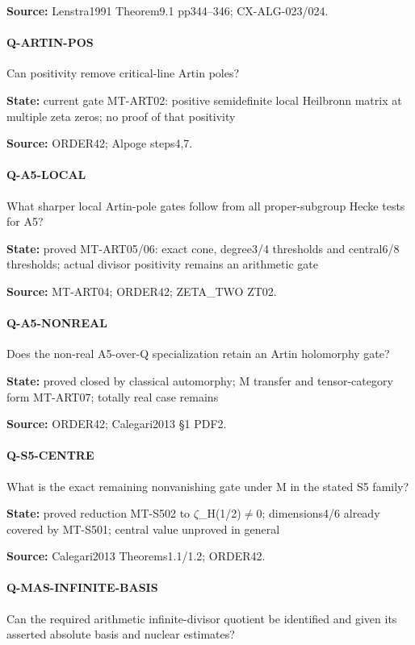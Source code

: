 \documentclass[11pt,a4paper]{article}
\begin{document}
\textbf{Source:} Lenstra1991 Theorem9.\allowbreak{}1 pp344–\allowbreak{}346; CX-ALG-023/\allowbreak{}024.

\paragraph{Q-ARTIN-POS} Can positivity remove critical-line Artin poles?

\textbf{State:} current gate MT-ART02:\allowbreak{} positive semidefinite local Heilbronn matrix at multiple zeta zeros; no proof of that positivity

\textbf{Source:} ORDER42; Alpoge steps4,7.

\paragraph{Q-A5-LOCAL} What sharper local Artin-pole gates follow from all proper-subgroup Hecke tests for A5?

\textbf{State:} proved MT-ART05/\allowbreak{}06:\allowbreak{} exact cone, degree3/\allowbreak{}4 thresholds and central6/\allowbreak{}8 thresholds; actual divisor positivity remains an arithmetic gate

\textbf{Source:} MT-ART04; ORDER42; ZETA\_\allowbreak{}TWO ZT02.

\paragraph{Q-A5-NONREAL} Does the non-real A5-over-Q specialization retain an Artin holomorphy gate?

\textbf{State:} proved closed by classical automorphy; M transfer and tensor-category form MT-ART07; totally real case remains

\textbf{Source:} ORDER42; Calegari2013 §1 PDF2.

\paragraph{Q-S5-CENTRE} What is the exact remaining nonvanishing gate under M in the stated S5 family?

\textbf{State:} proved reduction MT-S502 to \ensuremath{\zeta}\_\allowbreak{}H(1/\allowbreak{}2)\ensuremath{\ne}0; dimensions4/\allowbreak{}6 already covered by MT-S501; central value unproved in general

\textbf{Source:} Calegari2013 Theorems1.\allowbreak{}1/\allowbreak{}1.\allowbreak{}2; ORDER42.

\paragraph{Q-MAS-INFINITE-BASIS} Can the required arithmetic infinite-divisor quotient be identified and given its asserted absolute basis and nuclear estimates?
\end{document}

